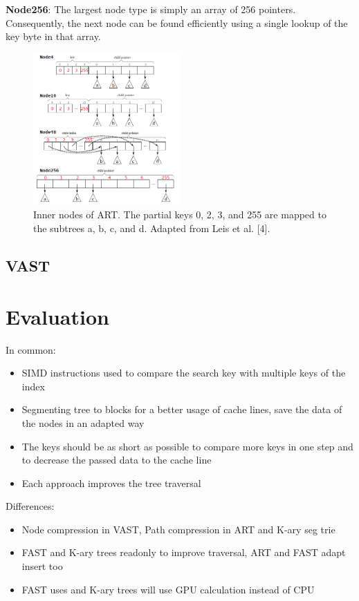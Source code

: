 \documentclass[conference]{IEEEtran}
\begin{document}
\textbf{Node256}: The largest node type is simply an array of 256 pointers. Consequently, the next node can be found efficiently using a single lookup of the key byte in that array. 

\begin{figure}
	\includegraphics[width=0.5\textwidth]{figure_4.png}
	\caption{Inner nodes of ART. The partial keys 0, 2, 3, and 255 are mapped to the subtrees a, b, c, and d. Adapted from Leis et al. [4].}
	\label{fig}
\end{figure}
\subsection{VAST}\label{SCM}

\section{Evaluation}
In common:
\begin{itemize}
	\item SIMD instructions used to compare the search key with multiple keys of the index
	\item Segmenting tree to blocks for a better usage of cache lines, save the data of the nodes in an adapted way
	\item The keys should be as short as possible to compare more keys in one step and to decrease the passed data to the cache line
	\item Each approach improves the tree traversal
\end{itemize}

Differences:
\begin{itemize}
	\item Node compression in VAST, Path compression in ART and K-ary seg trie
	\item FAST and K-ary trees readonly to improve traversal, ART and FAST adapt insert too
	\item FAST uses and K-ary trees will use GPU calculation instead of CPU
\end{itemize}
\end{document}

